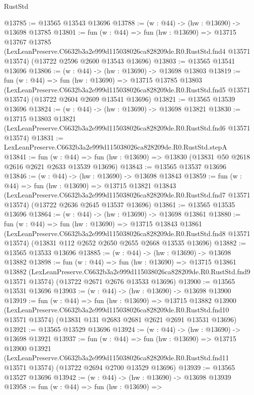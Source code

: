 \begin{lexlean}{RustStd}
\begin{coremodule}
@13785 := @13565 @13543 @13696
@13788 := (w : @44) -> (hw : @13690) -> @13698 @13785
@13801 := fun (w : @44) =>
  fun (hw : @13690) =>
  @13715
    @13767
    @13785
    (LexLeanPreserve.C6632b3a2e999d115038026ca828209de.R0.RustStd.fnd4 @13571 @13574)
    (@13722 @2596 @2600 @13543 @13696)
@13803 := @13565 @13541 @13696
@13806 := (w : @44) -> (hw : @13690) -> @13698 @13803
@13819 := fun (w : @44) =>
  fun (hw : @13690) =>
  @13715
    @13785
    @13803
    (LexLeanPreserve.C6632b3a2e999d115038026ca828209de.R0.RustStd.fnd5 @13571 @13574)
    (@13722 @2604 @2609 @13541 @13696)
@13821 := @13565 @13539 @13696
@13824 := (w : @44) -> (hw : @13690) -> @13698 @13821
@13830 := @13715
    @13803
    @13821
    (LexLeanPreserve.C6632b3a2e999d115038026ca828209de.R0.RustStd.fnd6 @13571 @13574)
@13831 := LexLeanPreserve.C6632b3a2e999d115038026ca828209de.R0.RustStd.stepA
@13841 := fun (w : @44) =>
  fun (hw : @13690) => @13830 (@13831 @50 @2618 @2616 @2621 @2633 @13539 @13696)
@13843 := @13565 @13537 @13696
@13846 := (w : @44) -> (hw : @13690) -> @13698 @13843
@13859 := fun (w : @44) =>
  fun (hw : @13690) =>
  @13715
    @13821
    @13843
    (LexLeanPreserve.C6632b3a2e999d115038026ca828209de.R0.RustStd.fnd7 @13571 @13574)
    (@13722 @2636 @2645 @13537 @13696)
@13861 := @13565 @13535 @13696
@13864 := (w : @44) -> (hw : @13690) -> @13698 @13861
@13880 := fun (w : @44) =>
  fun (hw : @13690) =>
  @13715
    @13843
    @13861
    (LexLeanPreserve.C6632b3a2e999d115038026ca828209de.R0.RustStd.fnd8 @13571 @13574)
    (@13831 @112 @2652 @2650 @2655 @2668 @13535 @13696)
@13882 := @13565 @13533 @13696
@13885 := (w : @44) -> (hw : @13690) -> @13698 @13882
@13898 := fun (w : @44) =>
  fun (hw : @13690) =>
  @13715
    @13861
    @13882
    (LexLeanPreserve.C6632b3a2e999d115038026ca828209de.R0.RustStd.fnd9 @13571 @13574)
    (@13722 @2671 @2676 @13533 @13696)
@13900 := @13565 @13531 @13696
@13903 := (w : @44) -> (hw : @13690) -> @13698 @13900
@13919 := fun (w : @44) =>
  fun (hw : @13690) =>
  @13715
    @13882
    @13900
    (LexLeanPreserve.C6632b3a2e999d115038026ca828209de.R0.RustStd.fnd10 @13571 @13574)
    (@13831 @131 @2683 @2681 @2621 @2691 @13531 @13696)
@13921 := @13565 @13529 @13696
@13924 := (w : @44) -> (hw : @13690) -> @13698 @13921
@13937 := fun (w : @44) =>
  fun (hw : @13690) =>
  @13715
    @13900
    @13921
    (LexLeanPreserve.C6632b3a2e999d115038026ca828209de.R0.RustStd.fnd11 @13571 @13574)
    (@13722 @2694 @2700 @13529 @13696)
@13939 := @13565 @13527 @13696
@13942 := (w : @44) -> (hw : @13690) -> @13698 @13939
@13958 := fun (w : @44) =>
  fun (hw : @13690) =>

\end{coremodule}
\end{lexlean}
